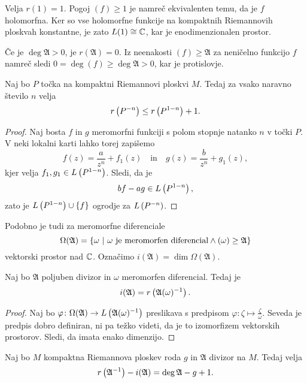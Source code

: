 \begin{zgled}
Velja $r(1) = 1$. Pogoj $(f) \geq 1$ je namreč ekvivalenten temu,
da je $f$ holomorfna. Ker so vse holomorfne funkcije na kompaktnih
Riemannovih ploskvah konstantne, je zato $L(1) \cong \mathbb{C}$, kar je
enodimenzionalen prostor.
\end{zgled}

\begin{zgled}
Če je $\deg \mathfrak{A} > 0$, je $r(\mathfrak{A}) = 0$. Iz
neenakosti $(f) \geq \mathfrak{A}$ za neničelno funkcijo $f$
namreč sledi $0 = \deg (f) \geq \deg \mathfrak{A} > 0$, kar je
protislovje.
\end{zgled}

\begin{trditev}
Naj bo $P$ točka na kompaktni Riemannovi ploskvi $M$. Tedaj za
vsako naravno število $n$ velja
\[
r \left(P^{-n}\right) \leq r \left(P^{1-n}\right) + 1.
\]
\end{trditev}

\begin{proof}
Naj bosta $f$ in $g$ meromorfni funkciji s polom stopnje natanko
$n$ v točki $P$. V neki lokalni karti lahko torej zapišemo
\[
f(z) = \frac{a}{z^n} + f_1(z)
\quad \text{in} \quad
g(z) = \frac{b}{z^n} + g_1(z),
\]
kjer velja $f_1, g_1 \in L \left(P^{1-n}\right)$. Sledi, da je
\[
b f - a g \in L \left(P^{1-n}\right),
\]
zato je $L \left(P^{1-n}\right) \cup \left\{f\right\}$ ogrodje za $L \left(P^{-n}\right)$.
\end{proof}

Podobno je tudi za meromorfne diferenciale
\[
\Omega(\mathfrak{A}) =
\left\{\omega~\middle\vert~\text{$\omega$ je meromorfen diferencial} \land
(\omega) \geq \mathfrak{A}\right\}
\]
vektorski prostor nad $\mathbb{C}$. Označimo
$i(\mathfrak{A}) = \dim \Omega(\mathfrak{A})$.

\begin{trditev}\label{td:mero_dif}
Naj bo $\mathfrak{A}$ poljuben divizor in $\omega$ meromorfen
diferencial. Tedaj je
\[
i(\mathfrak{A}) = r \left(\mathfrak{A} (\omega)^{-1}\right).
\]
\end{trditev}

\begin{proof}
Naj bo $\varphi \colon
\Omega(\mathfrak{A}) \to L \left(\mathfrak{A} (\omega)^{-1}\right)$
preslikava s predpisom
$\varphi \colon \zeta \mapsto \frac{\zeta}{\omega}$. Seveda je
predpis dobro definiran, ni pa težko videti, da je to izomorfizem
vektorskih prostorov. Sledi, da imata enako dimenzijo.
\end{proof}

\begin{izrek}
Naj bo $M$ kompaktna Riemannova ploskev roda $g$ in $\mathfrak{A}$
divizor na $M$. Tedaj velja
\[
r \left(\mathfrak{A}^{-1}\right) - i(\mathfrak{A}) =
\deg \mathfrak{A} - g + 1.
\]
\end{izrek}

